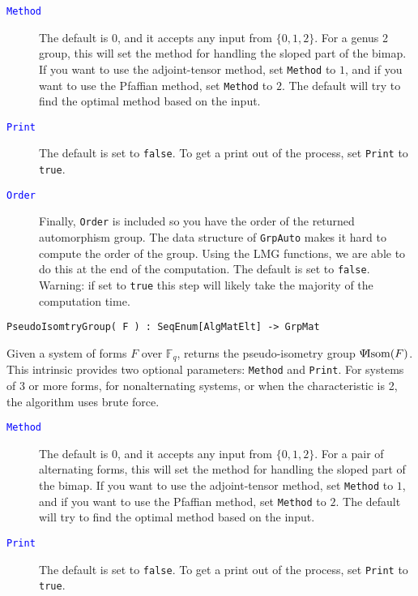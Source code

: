 \documentclass{documentation}
\DeclareMathOperator{\isom}{Isom}
\newcommand{\pseudo}{\Psi\hspace*{-1mm}\isom}
\begin{document}
\begin{description}
\item[\textcolor{blue}{\tt Method}]
The default is $0$, and it accepts any input from $\{ 0,1,2\}$. 
For a genus 2 group, this will set the method for handling the sloped part of the bimap.
If you want to use the adjoint-tensor method, set {\tt Method} to $1$, and if you want to use the Pfaffian
method, set {\tt Method} to $2$. The default will try to find the optimal method based on the input. 
\item[\textcolor{blue}{\tt Print}]
The default is set to {\tt false}. To get a print out of the process, set {\tt Print} to {\tt true}. 
\item[\textcolor{blue}{\tt Order}]
Finally, {\tt Order} is included so you have the order of the returned automorphism group. The data structure of {\tt GrpAuto} makes it hard to compute the order of the group. Using the LMG functions, we are able to do this at the end of the computation. The default is set to {\tt false}. Warning: if set to {\tt true} this step will likely take the majority of the computation time.
\end{description}

\color{blue}
\begin{verbatim}
PseudoIsomtryGroup( F ) : SeqEnum[AlgMatElt] -> GrpMat
\end{verbatim}

\color{black}
Given a system of forms $F$ over $\mathbb{F}_q$, returns the pseudo-isometry group $\pseudo(F)$.
This intrinsic provides two optional parameters: {\tt Method} and {\tt Print}. 
For systems of 3 or more forms, for nonalternating systems, or when the characteristic is 2, the algorithm uses brute force. 

\begin{description}
\item[\textcolor{blue}{\tt Method}]
The default is $0$, and it accepts any input from $\{ 0,1,2\}$. 
For a pair of alternating forms, this will set the method for handling the sloped part of the bimap.
If you want to use the adjoint-tensor method, set {\tt Method} to $1$, and if you want to use the Pfaffian
method, set {\tt Method} to $2$. The default will try to find the optimal method based on the input. 
\item[\textcolor{blue}{\tt Print}]
The default is set to {\tt false}. To get a print out of the process, set {\tt Print} to {\tt true}. 
\end{description}
\end{document}
